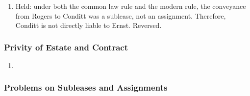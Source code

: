 \begin{enumerate}
    Rogers retained an interest, so the conveyance was a sublease.
    \begin{enumerate}
        \item Common law rule: ``If the instrument purports to transfer the 
        lessee's estate for the entire remainder of his term it is an 
        assignment, regardless of its form or the parties' intention. 
        Conversely, if the instrument purports to transfer the lessee's estate 
        for less than the entire term---even for a day less---it is a 
        sublease, regardless of its form or of the parties' 
        intention.''\footnote{Casebook p. 446.}
        \item Modern rule: follow the parties' intention.
    \end{enumerate}
    \item Held: under both the common law rule and the modern rule, the 
    conveyance from Rogers to Conditt was a sublease, not an assignment. 
    Therefore, Conditt is not directly liable to Ernst. Reversed.
\end{enumerate}

\subsubsection{Privity of Estate and Contract} %

\begin{enumerate}
    \item 
\end{enumerate}

\subsubsection{Problems on Subleases and Assignments}

